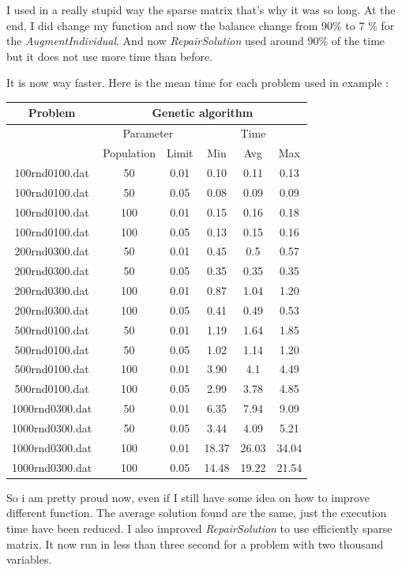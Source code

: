 \documentclass[12pt]{article}
\begin{document}
	I used in a really stupid way the sparse matrix that's why it was so long.
	\pagebreak
	At the end, I did change my function and now the balance change from 90\% to 7 \% for the \textit{AugmentIndividual}. And now \textit{RepairSolution} used around 90\% of the time but it does not use more time than before.
	
	It is now way faster. Here is the mean time for each problem used in example :
	\begin{center}
		\begin{tabular}{|c|c|c|c|c|c|}
			\hline
			Problem & \multicolumn{5}{|c|}{Genetic algorithm} \\
			\hline
			& \multicolumn{2}{|c|}{Parameter} & \multicolumn{3}{|c|}{Time}  \\
			\hline
			& Population & Limit & Min & Avg & Max\\
			\hline
			100rnd0100.dat & 50  & 0.01 & 0.10& 0.11& 0.13 \\
			\hline
			100rnd0100.dat & 50  & 0.05  & 0.08& 0.09& 0.09\\
			\hline
			100rnd0100.dat & 100 & 0.01  & 0.15& 0.16& 0.18\\
			\hline
			100rnd0100.dat & 100 & 0.05 & 0.13& 0.15& 0.16\\
			\hline
			200rnd0300.dat & 50  & 0.01 & 0.45& 0.5& 0.57 \\
			\hline
			200rnd0300.dat & 50  & 0.05 & 0.35& 0.35& 0.35			\\
			\hline
			200rnd0300.dat & 100 & 0.01 & 0.87& 1.04& 1.20\\
			\hline
			200rnd0300.dat & 100 & 0.05  & 0.41& 0.49& 0.53
			\\
			\hline
			500rnd0100.dat & 50  & 0.01 & 1.19 & 1.64 & 1.85
			
			\\
			\hline
			500rnd0100.dat & 50  & 0.05 & 1.02 &1.14&1.20
			\\
			\hline
			500rnd0100.dat & 100 & 0.01
			& 3.90 & 4.1 & 4.49
			\\
			\hline
			500rnd0100.dat & 100 & 0.05 & 
			2.99 & 3.78 & 4.85 
			\\
			\hline
			1000rnd0300.dat & 50  & 0.01 & 6.35 & 7.94 & 9.09
			\\
			\hline
			1000rnd0300.dat & 50  & 0.05 & 3.44 & 4.09 & 5.21
			\\
			\hline
			1000rnd0300.dat & 100 & 0.01 &
			18.37 & 26.03 & 34.04 
			\\
			\hline
			1000rnd0300.dat & 100 & 0.05 & 
			14.48 & 19.22 & 21.54
			\\
			\hline
		\end{tabular}
	\end{center}
	So i am pretty proud now, even if I still have some idea on how to improve different function. The average solution found are the same, just the execution time have been reduced.
	I also improved \textit{RepairSolution}  to use efficiently sparse matrix.
	It now run in less than three second for a problem with two thousand variables.
\end{document}
